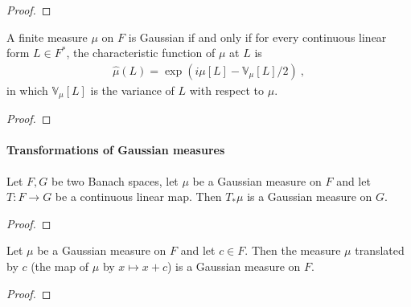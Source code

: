 \begin{proof}\leanok

\end{proof}


\begin{theorem}\label{thm:isGaussian_iff_charFunDual_eq}
  \mathlibok
A finite measure $\mu$ on $F$ is Gaussian if and only if for every continuous linear form $L \in F^*$, the characteristic function of $\mu$ at $L$ is
\begin{align*}
  \hat{\mu}(L) = \exp\left(i \mu[L] - \mathbb{V}_\mu[L] / 2\right) \: ,
\end{align*}
in which $\mathbb{V}_\mu[L]$ is the variance of $L$ with respect to $\mu$.
\end{theorem}

\begin{proof}

\end{proof}



\paragraph{Transformations of Gaussian measures}

\begin{lemma}\label{lem:isGaussian_map}
  \mathlibok
Let $F, G$ be two Banach spaces, let $\mu$ be a Gaussian measure on $F$ and let $T : F \to G$ be a continuous linear map.
Then $T_*\mu$ is a Gaussian measure on $G$.
\end{lemma}

\begin{proof}
\end{proof}


\begin{lemma}\label{lem:isGaussian_add_const}
Let $\mu$ be a Gaussian measure on $F$ and let $c \in F$.
Then the measure $\mu$ translated by $c$ (the map of $\mu$ by $x \mapsto x + c$) is a Gaussian measure on $F$.
\end{lemma}

\begin{proof}
\end{proof}


